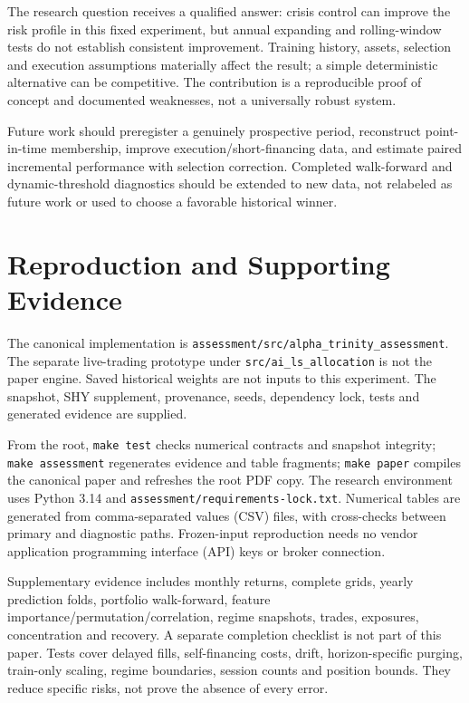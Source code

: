 \documentclass[3p,times]{elsarticle}
\begin{document}
The research question receives a qualified answer: crisis control can improve the risk profile in this fixed experiment, but annual expanding and rolling-window tests do not establish consistent improvement. Training history, assets, selection and execution assumptions materially affect the result; a simple deterministic alternative can be competitive. The contribution is a reproducible proof of concept and documented weaknesses, not a universally robust system.

Future work should preregister a genuinely prospective period, reconstruct point-in-time membership, improve execution/short-financing data, and estimate paired incremental performance with selection correction. Completed walk-forward and dynamic-threshold diagnostics should be extended to new data, not relabeled as future work or used to choose a favorable historical winner.
\FloatBarrier
\appendix
\section{Reproduction and Supporting Evidence}
The canonical implementation is \texttt{assessment/src/alpha\_trinity\_assessment}. The separate live-trading prototype under \texttt{src/ai\_ls\_allocation} is not the paper engine. Saved historical weights are not inputs to this experiment. The snapshot, SHY supplement, provenance, seeds, dependency lock, tests and generated evidence are supplied.

From the root, \texttt{make test} checks numerical contracts and snapshot integrity; \texttt{make assessment} regenerates evidence and table fragments; \texttt{make paper} compiles the canonical paper and refreshes the root PDF copy. The research environment uses Python 3.14 and \texttt{assessment/requirements-lock.txt}. Numerical tables are generated from comma-separated values (CSV) files, with cross-checks between primary and diagnostic paths. Frozen-input reproduction needs no vendor application programming interface (API) keys or broker connection.

Supplementary evidence includes monthly returns, complete grids, yearly prediction folds, portfolio walk-forward, feature importance/permutation/correlation, regime snapshots, trades, exposures, concentration and recovery. A separate completion checklist is not part of this paper. Tests cover delayed fills, self-financing costs, drift, horizon-specific purging, train-only scaling, regime boundaries, session counts and position bounds. They reduce specific risks, not prove the absence of every error.
\end{document}
